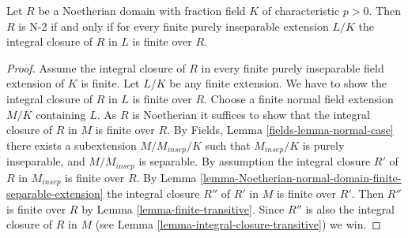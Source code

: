 \begin{lemma}
\label{lemma-domain-char-p-N-1-2}
Let $R$ be a Noetherian domain with fraction field $K$ of
characteristic $p > 0$. Then $R$ is N-2 if and only if
for every finite purely inseparable extension $L/K$ the integral
closure of $R$ in $L$ is finite over $R$.
\end{lemma}

\begin{proof}
Assume the integral closure of $R$ in every finite purely inseparable
field extension of $K$ is finite.
Let $L/K$ be any finite extension. We have to show the
integral closure of $R$ in $L$ is finite over $R$.
Choose a finite normal field extension $M/K$
containing $L$. As $R$ is Noetherian it suffices to show that
the integral closure of $R$ in $M$ is finite over $R$.
By Fields, Lemma \ref{fields-lemma-normal-case}
there exists a subextension $M/M_{insep}/K$
such that $M_{insep}/K$ is purely inseparable, and $M/M_{insep}$
is separable. By assumption the integral closure $R'$ of $R$ in
$M_{insep}$ is finite over $R$. By
Lemma \ref{lemma-Noetherian-normal-domain-finite-separable-extension}
the integral
closure $R''$ of $R'$ in $M$ is finite over $R'$. Then $R''$ is finite
over $R$ by Lemma \ref{lemma-finite-transitive}.
Since $R''$ is also the integral closure
of $R$ in $M$ (see Lemma \ref{lemma-integral-closure-transitive}) we win.
\end{proof}
